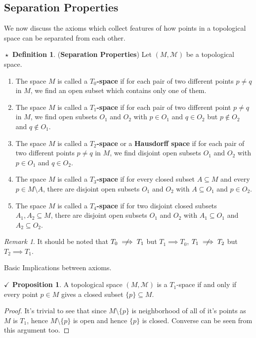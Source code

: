 \documentclass{article}
\newcommand{\notset}[0]{\setminus}
\theoremstyle{definition}
\newtheorem{definition}{$\boxed{\star}$ Definition}
\theoremstyle{remark}
\newtheorem*{remark}{Remark}
\theoremstyle{definition}
\theoremstyle{definition}
\newtheorem{proposition}{$\checkmark$ Proposition}
\newcommand{\topo}[1]{\mathcal{#1}}
\begin{document}
\subsection{Separation Properties}
We now discuss the axioms which collect features of how points in a topological space can be separated from each other.

\hrulefill
\begin{definition}
	(\textbf{Separation Properties}) Let $ (M,\topo{M}) $ be a topological space.
	\begin{enumerate}
		\item{The space $ M $ is called a \textbf{$ T_0 $-space} if for each pair of two different points $ p\neq q $ in $ M $, we find an open subset which contains only one of them.}
		\item{The space $ M $ is called a \textbf{$ T_1 $-space} if for each pair of two different point $ p\neq q $ in $ M $, we find open subsets $ O_1 $ and $ O_2 $ with $ p\in O_1 $ and $ q\in O_2 $ but $ p\notin O_2 $ and $ q \notin O_1 $.}
		\item{The space $ M $ is called a \textbf{$ T_2 $-space} or a \textbf{Hausdorff space} if for each pair of two different points $ p\neq q $ in $ M $, we find disjoint open subsets $ O_1 $ and $ O_2 $ with $ p\in O_1 $ and $ q\in O_2 $.}
		\item{The space $ M $ is called a \textbf{$ T_3 $-space} if for every closed subset $ A\subseteq M $ and every $ p\in M\notset A $, there are disjoint open subsets $ O_1 $ and $ O_2 $ with $ A\subseteq O_1 $ and $ p\in O_2 $.}
		\item{The space $ M $ is called a \textbf{$ T_4 $-space} if for two disjoint closed subsets $ A_1,A_2 \subseteq M $, there are disjoint open subsets $ O_1 $ and $ O_2 $ with $ A_1\subseteq O_1 $ and $ A_2 \subseteq O_2 $.}
	\end{enumerate}
\end{definition}
\begin{remark}
	It should be noted that $ T_0 \centernot \implies T_1  $ but $ T_1 \implies T_0 $, $ T_1 \centernot \implies T_2 $ but $ T_2 \implies T_1 $.
\end{remark}
\hrulefill
Basic Implications between axioms.
\hrulefill
\begin{proposition}
	A topological space $ (M,\topo{M}) $ is a $ T_1 $-space if and only if every point $ p\in M $ gives a closed subset $ \{p\}\subseteq M $.
\end{proposition}
\begin{proof}
	It's trivial to see that since $ M\notset \{p\} $ is neighborhood of all of it's points as $ M $ is $ T_1 $, hence $ M\notset \{p\} $ is open and hence $ \{p\} $ is closed. Converse can be seen from this argument too.
\end{proof}
\end{document}
